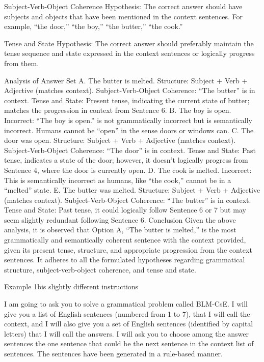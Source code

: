 Subject-Verb-Object Coherence Hypothesis: The correct answer should have subjects and objects that have been mentioned in the context sentences. For example, “the door,” “the boy,” “the butter,” “the cook.”

Tense and State Hypothesis: The correct answer should preferably maintain the tense sequence and state expressed in the context sentences or logically progress from them.

Analysis of Answer Set
A. The butter is melted.
Structure: Subject + Verb + Adjective (matches context).
Subject-Verb-Object Coherence: “The butter” is in context.
Tense and State: Present tense, indicating the current state of butter; matches the progression in context from Sentence 6.
B. The boy is open.
Incorrect: “The boy is open.” is not grammatically incorrect but is semantically incorrect. Humans cannot be “open” in the sense doors or windows can.
C. The door was open.
Structure: Subject + Verb + Adjective (matches context).
Subject-Verb-Object Coherence: “The door” is in context.
Tense and State: Past tense, indicates a state of the door; however, it doesn't logically progress from Sentence 4, where the door is currently open.
D. The cook is melted.
Incorrect: This is semantically incorrect as humans, like “the cook,” cannot be in a “melted” state.
E. The butter was melted.
Structure: Subject + Verb + Adjective (matches context).
Subject-Verb-Object Coherence: “The butter” is in context.
Tense and State: Past tense, it could logically follow Sentence 6 or 7 but may seem slightly redundant following Sentence 6.
Conclusion
Given the above analysis, it is observed that Option A, “The butter is melted,” is the most grammatically and semantically coherent sentence with the context provided, given its present tense, structure, and appropriate progression from the context sentences. It adheres to all the formulated hypotheses regarding grammatical structure, subject-verb-object coherence, and tense and state.

Example 1bis slightly different instructions 

I am going to ask you to solve a grammatical problem called BLM-CsE.  I will give you a list of English sentences (numbered from 1 to 7), that I will call the context, and I will also give you a set of English sentences (identified by capital letters) that I will call  the answers. I will ask you to choose among the answer sentences the one sentence that could be the next sentence in the context list of sentences. The sentences have been generated in a rule-based manner. 

